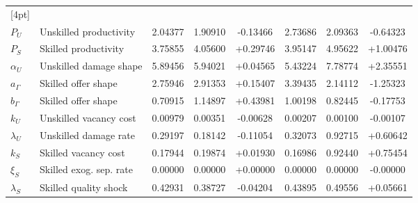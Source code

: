 \begin{table}[htbp]
\begin{tabular}{llcccccc}
[4pt]
\multicolumn{8}{l}{\textit{Regime-specific}} \\[2pt]
\quad $P_U$ & Unskilled productivity & 2.04377 & 1.90910 & -0.13466 & 2.73686 & 2.09363 & -0.64323 \\
\quad $P_S$ & Skilled productivity & 3.75855 & 4.05600 & +0.29746 & 3.95147 & 4.95622 & +1.00476 \\
\quad $\alpha_U$ & Unskilled damage shape & 5.89456 & 5.94021 & +0.04565 & 5.43224 & 7.78774 & +2.35551 \\
\quad $a_\Gamma$ & Skilled offer shape & 2.75946 & 2.91353 & +0.15407 & 3.39435 & 2.14112 & -1.25323 \\
\quad $b_\Gamma$ & Skilled offer shape & 0.70915 & 1.14897 & +0.43981 & 1.00198 & 0.82445 & -0.17753 \\
\quad $k_U$ & Unskilled vacancy cost & 0.00979 & 0.00351 & -0.00628 & 0.00207 & 0.00100 & -0.00107 \\
\quad $\lambda_U$ & Unskilled damage rate & 0.29197 & 0.18142 & -0.11054 & 0.32073 & 0.92715 & +0.60642 \\
\quad $k_S$ & Skilled vacancy cost & 0.17944 & 0.19874 & +0.01930 & 0.16986 & 0.92440 & +0.75454 \\
\quad $\xi_S$ & Skilled exog. sep. rate & 0.00000 & 0.00000 & +0.00000 & 0.00000 & 0.00000 & -0.00000 \\
\quad $\lambda_S$ & Skilled quality shock & 0.42931 & 0.38727 & -0.04204 & 0.43895 & 0.49556 & +0.05661 \\
\bottomrule
\end{tabular}
\end{table}
